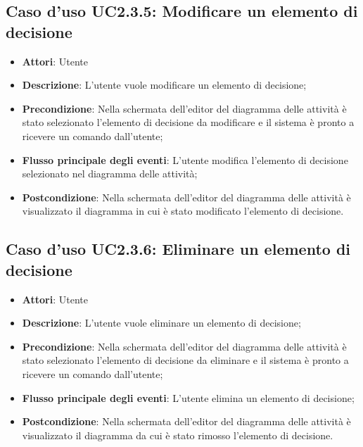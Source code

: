 \documentclass[../AnalisiDeiRequisiti.tex]{subfiles}
\begin{document}
					\subsection{Caso d'uso UC2.3.5: Modificare un elemento di decisione}
					\begin{itemize}
						\item \textbf{Attori}: Utente
						\item \textbf{Descrizione}: L'utente vuole modificare un elemento di decisione;
						\item \textbf{Precondizione}: Nella schermata dell'editor del diagramma delle attività è stato selezionato l'elemento di decisione da modificare e il sistema è pronto a ricevere un comando dall'utente;
						\item \textbf{Flusso principale degli eventi}: L'utente modifica l'elemento di decisione selezionato nel diagramma delle attività;
						\item \textbf{Postcondizione}: Nella schermata dell'editor del diagramma delle attività è visualizzato il diagramma in cui è stato modificato l'elemento di decisione.
					\end{itemize}
					\subsection{Caso d'uso UC2.3.6: Eliminare un elemento di decisione}
					\begin{itemize}
						\item \textbf{Attori}: Utente
						\item \textbf{Descrizione}: L'utente vuole eliminare un elemento di decisione;
						\item \textbf{Precondizione}: Nella schermata dell'editor del diagramma delle attività è stato selezionato l'elemento di decisione da eliminare e il sistema è pronto a ricevere un comando dall'utente;
						\item \textbf{Flusso principale degli eventi}: L'utente elimina un elemento di decisione;
						\item \textbf{Postcondizione}: Nella schermata dell'editor del diagramma delle attività è visualizzato il diagramma da cui è stato rimosso l'elemento di decisione.
					\end{itemize}
\end{document}
